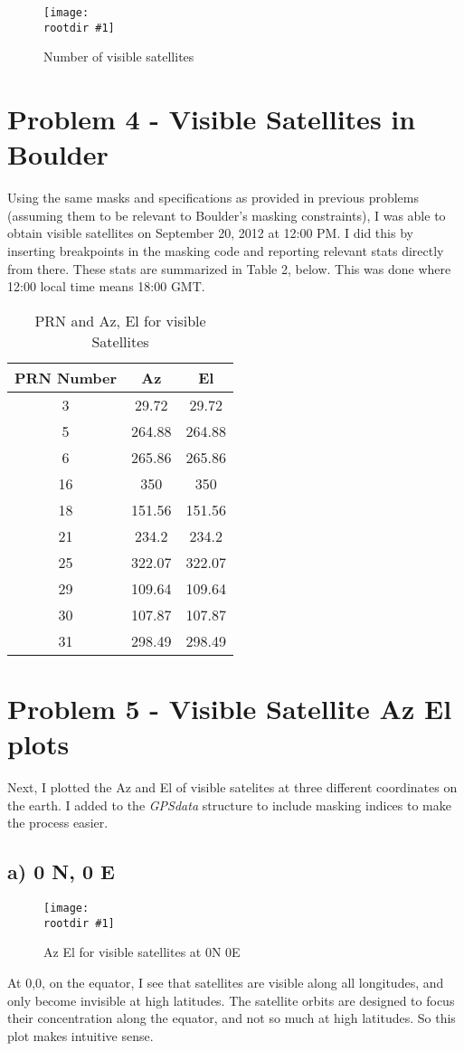 \documentclass[12pt,a4paper,oneside]{article}
\newcommand{\rootdir}{./Figures/}
\newcommand{\figH}[3]{
			\begin{figure}[H]
				\centering
				\texttt{[image: \\rootdir \#1]}
				\caption{#2}
				\label{#3}
			\end{figure}
			}
\begin{document}
\figH{NumVisSats.png}{Number of visible satellites}{fig:numvissats}

\section{Problem 4 - Visible Satellites in Boulder}
Using the same masks and specifications as provided in previous problems (assuming them to be relevant to Boulder's masking constraints), I was able to obtain visible satellites on September 20, 2012 at 12:00 PM. I did this by inserting breakpoints in the masking code and reporting relevant stats directly from there. These stats are summarized in Table 2, below. This was done where 12:00 local time means 18:00 GMT.
\begin{table}[H]
	\centering
	\begin{tabular}{|c|c|c|}
		\hline
		\textbf{PRN Number} &	\textbf{Az} & \textbf{El}	 \\\hline
		   3&29.72&29.72\\\hline5&264.88&264.88\\\hline6&265.86&265.86\\\hline16&350&350\\\hline18&151.56&151.56\\\hline21&234.2&234.2\\\hline25&322.07&322.07\\\hline29&109.64&109.64\\\hline30&107.87&107.87\\\hline31&298.49&298.49\\\hline
	\end{tabular}
	\caption{PRN and Az, El for visible Satellites}
\end{table}

\section{Problem 5 - Visible Satellite Az El plots}
Next, I plotted the Az and El of visible satelites at three different coordinates on the earth. I added to the \emph{GPSdata} structure to include masking indices to make the process easier. 

\subsection{a) 0 N, 0 E}
\figH{VisAzEl0-0.eps}{Az El for visible satellites at 0N 0E}{fig:AzEl00}
At 0,0, on the equator, I see that satellites are visible along all longitudes, and only become invisible at high latitudes. The satellite orbits are designed to focus their concentration along the equator, and not so much at high latitudes. So this plot makes intuitive sense. 
\end{document}
